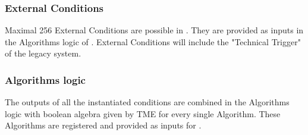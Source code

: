 \subsubsection{External Conditions}
\label{sec:gtl:external_conditions}
Maximal 256 External Conditions are possible in \gt. They are provided as inputs in the Algorithms logic of \ugtl.
External Conditions will include the "Technical Trigger" of the legacy system.

\subsubsection{Algorithms logic}
\label{sec:gtl:algorithms_logic}

The outputs of all the instantiated conditions are combined in the Algorithms logic with boolean algebra given by TME for every single Algorithm. These Algorithms are registered and provided
as inputs for \fdl.

\clearpage


